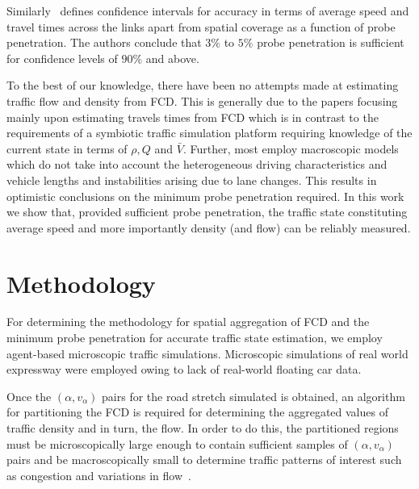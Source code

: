 \documentclass[procedia]{easychair}
\begin{document}
 Similarly~\cite{dai2003simulation} defines confidence intervals for accuracy in terms of average speed and travel times across the links apart from spatial coverage as a function of probe penetration. The authors conclude that $3\%$ to $5\%$ probe penetration is sufficient for confidence levels of $90\%$ and above. 
 
 To the best of our knowledge, there have been no attempts made at estimating traffic flow and density from FCD. This is generally due to the papers focusing mainly upon estimating travels times from FCD which is in contrast to the requirements of a symbiotic traffic simulation platform requiring knowledge of the current state in terms of $\rho, Q$ and $\bar{V}$. Further, most employ macroscopic models which do not take into account the heterogeneous driving characteristics and vehicle lengths and instabilities arising due to lane changes. This results in optimistic conclusions on the minimum probe penetration required. In this work we show that, provided sufficient probe penetration, the traffic state constituting average speed and more importantly density (and flow) can be reliably measured. 
 
 
 \section{Methodology}
 \label{sec:Methodology}
 
 For determining the methodology for spatial aggregation of FCD and the minimum probe penetration for accurate traffic state estimation, we employ agent-based microscopic traffic simulations. Microscopic simulations  of real world expressway were employed owing to lack of real-world floating car data.
 
 Once the $(\alpha, v_{\alpha})$ pairs for the road stretch simulated is obtained, an algorithm for partitioning the FCD is required for determining the aggregated values of traffic density and in turn, the flow. In order to do this, the partitioned regions must be microscopically large enough to contain sufficient samples of $(\alpha, v_{\alpha})$ pairs and be macroscopically small to determine traffic patterns of interest such as congestion and variations in flow~\cite{Traffic_Flow_Treiber}. 
 
\end{document}
